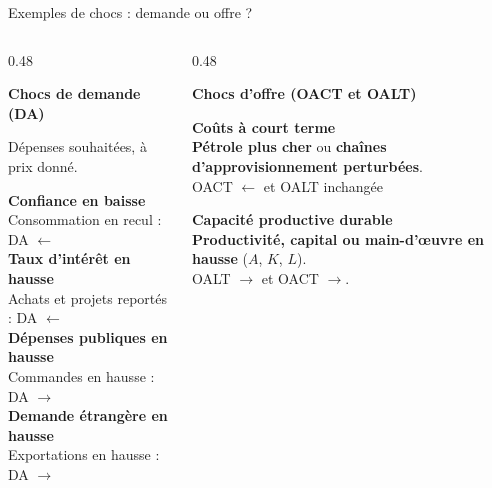 \documentclass[aspectratio=169]{beamer}
\begin{document}
\begin{frame}{Exemples de chocs : demande ou offre ?}
\begin{columns}[T,onlytextwidth]
\begin{column}{0.48\textwidth}
\begin{tcolorbox}[colback=HECnavy!5, colframe=HECnavy!5, boxrule=0pt, arc=7pt, left=10pt, right=10pt, top=10pt, bottom=10pt, equal height group=shocklists]
\RaggedRight\textbf{\textcolor{HECnavy}{Chocs de demande (DA)}}\par\vspace{5pt}
\small Dépenses souhaitées, à prix donné.
\par\vspace{9pt}
\textbf{Confiance en baisse}\\
Consommation en recul : DA $\leftarrow$\\[7pt]
\textbf{Taux d'intérêt en hausse}\\
Achats et projets reportés : DA $\leftarrow$\\[7pt]
\textbf{Dépenses publiques en hausse}\\
Commandes en hausse : DA $\rightarrow$\\[7pt]
\textbf{Demande étrangère en hausse}\\
Exportations en hausse : DA $\rightarrow$
\end{tcolorbox}
\end{column}
\begin{column}{0.48\textwidth}
\begin{tcolorbox}[colback=HECcoral!5, colframe=HECcoral!5, boxrule=0pt, arc=7pt, left=10pt, right=10pt, top=10pt, bottom=10pt, equal height group=shocklists]
\RaggedRight\textbf{\textcolor{HECcoral}{Chocs d'offre (OACT et OALT)}}\par\vspace{12pt}
\small\textbf{\textcolor{HECcoral}{Coûts à court terme}}\\[5pt]
\textbf{Pétrole plus cher} ou \textbf{chaînes d'approvisionnement perturbées}.\\[5pt]
OACT $\leftarrow$ et OALT inchangée
\par\vspace{14pt}
\textbf{\textcolor{HECgreen}{Capacité productive durable}}\\[5pt]
\textbf{Productivité, capital ou main-d'œuvre en hausse} ($A$, $K$, $L$).\\[5pt]
OALT $\rightarrow$ et OACT $\rightarrow$.
\end{tcolorbox}
\end{column}
\end{columns}
\end{frame}
\end{document}
